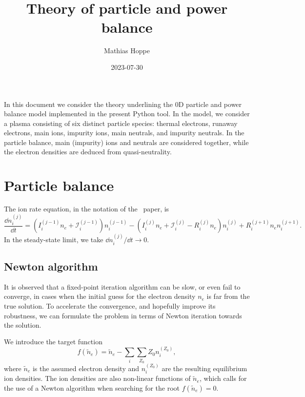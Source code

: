 \documentclass{notes}
\title{Theory of particle and power balance}
\author{Mathias Hoppe}
\date{2023-07-30}
\begin{document}
	\maketitle

	In this document we consider the theory underlining the 0D particle and
	power balance model implemented in the present Python tool. In the model,
	we consider a plasma consisting of six distinct particle species:
	thermal electrons, runaway electrons, main ions, impurity ions, main
	neutrals, and impurity neutrals. In the particle balance, main (impurity)
	ions and neutrals are considered together, while the electron densities are
	deduced from quasi-neutrality.

	\tableofcontents

	\section{Particle balance}
	The ion rate equation, in the notation of the \DREAM\ paper, is
	\begin{equation}\label{eq:ionrate}
		\frac{\dd n_i^{(j)}}{\dd t} =
			\left(
				I_i^{(j-1)}n_e+ 
				\mathcal{I}_i^{(j-1)}
			\right)n_i^{(j-1)} -
			\left(
				I_i^{(j)}n_e +
				\mathcal{I}_i^{(j)} -
				R_i^{(j)}n_e
			\right)n_i^{(j)} +
			R_i^{(j+1)}n_en_i^{(j+1)}.
	\end{equation}
	In the steady-state limit, we take $\dd n_i^{(j)}/\dd t\to 0$.

	\subsection{Newton algorithm}
	It is observed that a fixed-point iteration algorithm can be slow, or even
	fail to converge, in cases when the initial guess for the electron density
	$n_e$ is far from the true solution. To accelerate the convergence, and 
	hopefully improve its robustness, we can formulate the problem in terms of
	Newton iteration towards the solution.

	We introduce the target function
	\begin{equation}\label{eq:target}
		f(\tilde{n}_e) = \tilde{n}_e - \sum_i \sum_{Z_0} Z_0n_i^{(Z_0)},
	\end{equation}
	where $\tilde{n}_e$ is the assumed electron density and $n_i^{(Z_0)}$ are
	the resulting equilibrium ion densities. The ion densities are also
	non-linear functions of $\tilde{n}_e$, which calls for the use of a Newton
	algorithm when searching for the root $f(\tilde{n}_e)=0$.
\end{document}
